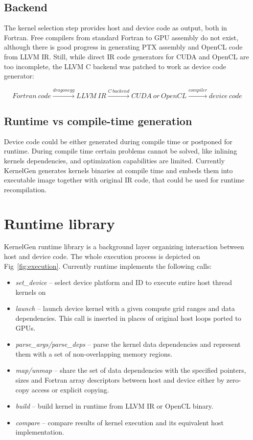\documentclass[a4,12pt]{article}
\begin{document}
\subsection{Backend}

The kernel selection step provides host and device code as output, both in Fortran. Free compilers from standard Fortran to GPU assembly do not exist, although there is good progress in generating PTX assembly and OpenCL code from LLVM IR. Still, while direct IR code generators for CUDA and OpenCL are too incomplete, the LLVM C backend was patched to work as device code generator:

$$
Fortran~code\xrightarrow{dragonegg}LLVM~IR\xrightarrow{C~backend}CUDA~or~OpenCL\xrightarrow{compiler}device~code
$$

\subsection{Runtime vs compile-time generation}

Device code could be either generated during compile time or postponed for runtime. During compile time certain problems cannot be solved, like inlining kernels dependencies, and optimization capabilities are limited. Currently KernelGen generates kernels binaries at compile time and embeds them into executable image together with original IR code, that could be used for runtime recompilation.

\section{Runtime library}

KernelGen runtime library is a background layer organizing interaction between host and device code. The whole execution process is depicted on Fig~\ref{fig:execution}. Currently runtime implements the following calls:

\begin{itemize}
\item \emph{set\_device} -- select device platform and ID to execute entire host thread kernels on
\item \emph{launch} -- launch device kernel with a given compute grid ranges and data dependencies. This call is inserted in places of original host loops ported to GPUs.
\item \emph{parse\_args/parse\_deps} -- parse the kernel data dependencies and represent them with a set of non-overlapping memory regions.
\item \emph{map/unmap} -- share the set of data dependencies with the specified pointers, sizes and Fortran array descriptors between host and device either by zero-copy access or explicit copying.
\item \emph{build} -- build kernel in runtime from LLVM IR or OpenCL binary.
\item \emph{compare} -- compare results of kernel execution and its equivalent host implementation.
\end{itemize}
\end{document}
